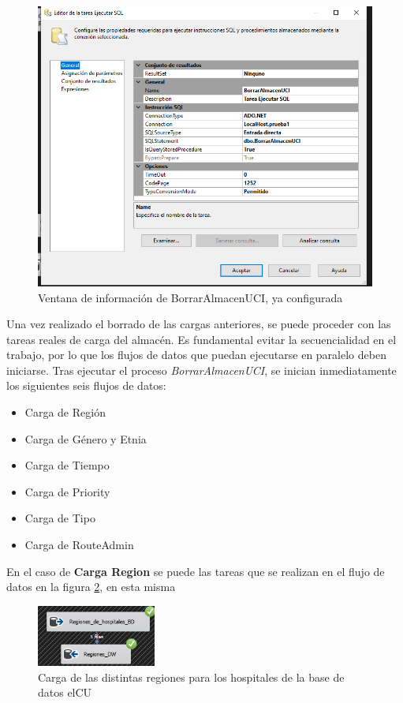 \documentclass[12pt, a4paper, twoside]{article}
\begin{document}
	\begin{figure}[h!]
		\centering
		\includegraphics[width=1\textwidth]{image/101_BorrarAlmacenUCI.png}
		\caption{Ventana de información de BorrarAlmacenUCI, ya configurada}
		\label{fig:3}
	\end{figure}
	
	Una vez realizado el borrado de las cargas anteriores, se puede proceder con las tareas reales de carga del almacén. Es fundamental evitar la secuencialidad en el trabajo, por lo que los flujos de datos que puedan ejecutarse en paralelo deben iniciarse. Tras ejecutar el proceso \textit{BorrarAlmacenUCI}, se inician inmediatamente los siguientes seis flujos de datos:
	
	\begin{itemize}
		\item Carga de Región
		\item Carga de Género y Etnia
		\item Carga de Tiempo
		\item Carga de Priority
		\item Carga de Tipo
		\item Carga de RouteAdmin
	\end{itemize}
	
	En el caso de \textbf{Carga Region} se puede las tareas que se realizan en el flujo de datos en la figura \ref{fig:4}, en esta misma 
	
	\begin{figure}[h]
		\centering
		\includegraphics[width=0.35\textwidth]{image/103_region.png}
		\caption{Carga de las distintas regiones para los hospitales de la base de datos elCU}
		\label{fig:4}
	\end{figure}
	
\end{document}
